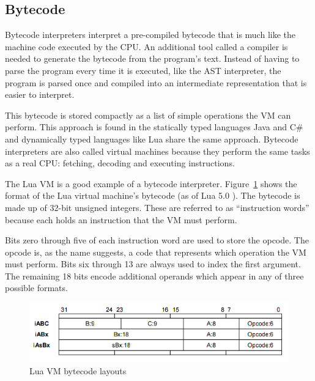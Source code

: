 \documentclass[english,a4paper,12pt]{report}
\begin{document}
\subsection{Bytecode}
Bytecode interpreters interpret a pre-compiled bytecode that is much
like the machine code executed by the CPU. An additional tool called a
compiler is needed to generate the bytecode from the program's
text. Instead of having to parse the program every time it is
executed, like the AST interpreter, the program is parsed once and
compiled into an intermediate representation that is easier to
interpret. 

This bytecode is stored compactly as a list of simple operations the
VM can perform. This approach is found in the statically typed
languages Java and C\# and dynamically typed languages like Lua share
the same approach. Bytecode interpreters are also called virtual
machines because they perform the same tasks as a real CPU: fetching,
decoding and executing instructions.

The Lua VM is a good example of a bytecode
interpreter. Figure~\ref{fig:luabyte} shows the format of the Lua
virtual machine's bytecode (as of Lua 5.0
\cite{RobertoIerusalimschy}). The bytecode is made up of 32-bit
unsigned integers. These are referred to as ``instruction words''
because each holds an instruction that the VM must perform. 

Bits zero through five of each instruction word are used to store the
opcode. The opcode is, as the name suggests, a code that represents
which operation the VM must perform. Bits six through 13 are always used
to index the first argument. The remaining 18 bits encode additional
operands which appear in any of three possible formats.

\begin{figure}
	\begin{center}
	    \includegraphics[scale=0.5]{luabytecode.png}
	\end{center}
 
  \caption[Lua VM bytecode layouts]{Lua VM bytecode layouts
    \protect\cite{RobertoIerusalimschy}}
  \label{fig:luabyte}
\end{figure}
\end{document}

